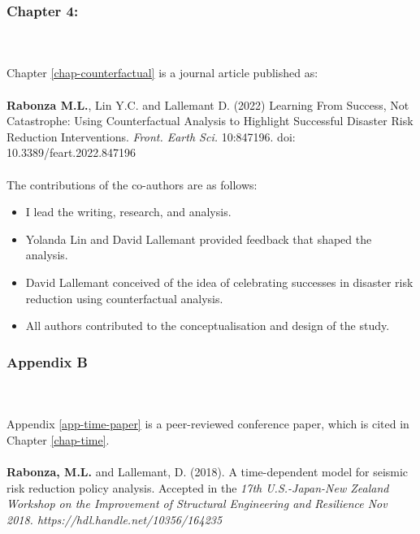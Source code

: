 {%
\vspace{.2cm}
\subsubsection*{Chapter 4:}
\\ \\ \noindent
Chapter \ref{chap-counterfactual} is a journal article published as:
\\ \\ \noindent
    \textbf{Rabonza M.L.}, Lin Y.C. and Lallemant D. (2022) Learning From Success, Not Catastrophe: Using Counterfactual Analysis to Highlight Successful Disaster Risk Reduction Interventions. \textit{Front. Earth Sci.} 10:847196. doi: 10.3389/feart.2022.847196
\\ \\ \noindent
    The contributions of the co-authors are as follows:
    \begin{itemize}
    \setlength\itemsep{-0.45em}
    \item I lead the writing, research, and analysis. 
    \item Yolanda Lin and David Lallemant provided feedback that shaped the analysis.
    \item David Lallemant conceived of the idea of celebrating successes in disaster risk reduction using counterfactual analysis. 
    \item All authors contributed to the conceptualisation and design of the study. 
    \end{itemize}

\vspace{.2cm}
\subsubsection*{Appendix B}
\\ \\ \noindent
Appendix \ref{app-time-paper} is a peer-reviewed conference paper, which is cited in Chapter \ref{chap-time}.
\\  \noindent \\
\textbf{Rabonza, M.L.} and Lallemant, D. (2018). A time-dependent model for seismic risk reduction policy analysis. Accepted in the \textit{17th U.S.-Japan-New Zealand Workshop on the Improvement of Structural Engineering and Resilience Nov 2018. https://hdl.handle.net/10356/164235}

}
